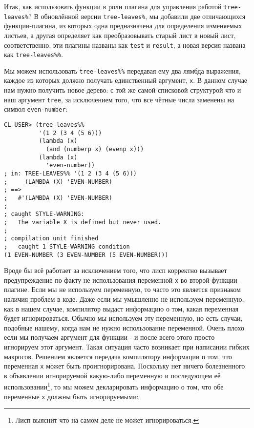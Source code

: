 Итак, как использовать функции в роли плагина для управления работой \verb"tree-leaves%"? В обновлённой версии \verb"tree-leaves%", мы добавили две отличающихся функции-плагина, из которых одна предназначена для определения изменяемых листьев, а другая определяет как преобразовывать старый лист в новый лист, соответственно, эти плагины названы как \verb"test" и \verb"result", а новая версия названа как \verb"tree-leaves%%".

Мы можем использовать \verb"tree-leaves%%" передавая ему два лямбда выражения, каждое из которых должно получать единственный аргумент, \verb"x". В данном случае нам нужно получить новое дерево: с той же самой списковой структурой что и наш аргумент \verb"tree", за исключением того, что все чётные числа заменены на символ \verb"even-number":

\begin{verbatim}
CL-USER> (tree-leaves%%
          '(1 2 (3 4 (5 6)))
          (lambda (x)
            (and (numberp x) (evenp x)))
          (lambda (x)
            'even-number))
; in: TREE-LEAVES%% '(1 2 (3 4 (5 6)))
;     (LAMBDA (X) 'EVEN-NUMBER)
; ==>
;   #'(LAMBDA (X) 'EVEN-NUMBER)
; 
; caught STYLE-WARNING:
;   The variable X is defined but never used.
; 
; compilation unit finished
;   caught 1 STYLE-WARNING condition
(1 EVEN-NUMBER (3 EVEN-NUMBER (5 EVEN-NUMBER)))
\end{verbatim}

Вроде бы всё работает за исключением того, что лисп корректно вызывает предупреждение по факту не использования переменной \verb"x" во второй функции - плагине. Если мы не используем переменную, то часто это является признаком наличия проблем в коде. Даже если мы умышленно не используем переменную, как в нашем случае, компилятор выдаст информацию о том, какая переменная будет игнорироваться. Обычно мы используем эту переменную, но есть случаи, подобные нашему, когда нам не нужно использование переменной. Очень плохо если мы получаем аргумент для функции - и после всего этого просто игнорируем этот аргумент. Такая ситуация часто возникает при написании гибких макросов. Решением является передача компилятору информации о том, что переменная \verb"x" может быть проигнорирована. Поскольку нет ничего болезненного в объявлении игнорируемой какую-либо переменную и последующем её использовании\footnote{Лисп выяснит что на самом деле не может игнорироваться.}, то мы можем декларировать информацию о том, что обе переменные \verb"x" должны быть игнорируемыми:



